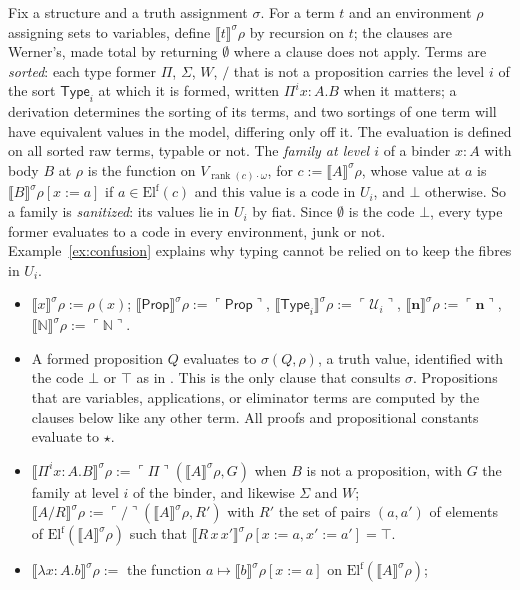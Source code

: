 \documentclass[10pt]{article}
\newcommand{\N}{\mathbb{N}}
\newcommand{\Prop}{\mathsf{Prop}}
\newcommand{\Type}{\mathsf{Type}}
\newcommand{\rk}{\operatorname{rank}}
\newcommand{\sem}[1]{\llbracket #1\rrbracket}
\newcommand{\El}{\mathrm{El}}
\newcommand{\code}[1]{\ulcorner #1\urcorner}
\newcommand{\U}{\mathcal{U}}
\begin{document}
\begin{definition}\label{def:fulleval}
Fix a structure and a truth assignment $\sigma$. For a term $t$ and an
environment $\rho$ assigning sets to variables, define $\sem t^\sigma\rho$
by recursion on $t$; the clauses are Werner's, made total by returning
$\emptyset$ where a clause does not apply. Terms are \emph{sorted}: each
type former $\Pi$, $\Sigma$, $W$, $/$ that is not a proposition carries
the level $i$ of the sort $\Type_i$ at which it is formed, written
$\Pi^ix{:}A.B$ when it matters; a derivation determines the sorting of
its terms, and two sortings of one term will have equivalent values in
the model, differing only off it. The evaluation is defined on all
sorted raw terms, typable or not. The \emph{family at level $i$} of a
binder $x{:}A$ with body $B$ at $\rho$ is the function on
$V_{\rk(c)\cdot\omega}$, for $c:=\sem A^\sigma\rho$, whose value at $a$ is
$\sem B^\sigma\rho[x{:=}a]$ if $a\in\El^{\mathrm f}(c)$ and this value is a
code in $U_i$, and $\bot$ otherwise. So a family is \emph{sanitized}: its
values lie in $U_i$ by fiat. Since $\emptyset$ is the code $\bot$, every
type former evaluates to a code in every environment, junk or not.
Example~\ref{ex:confusion} explains why typing cannot be relied on to
keep the fibres in $U_i$.
\begin{itemize}
\item $\sem x^\sigma\rho:=\rho(x)$; $\sem{\Prop}^\sigma\rho:=\code\Prop$,
  $\sem{\Type_i}^\sigma\rho:=\code{\U_i}$,
  $\sem{\mathbf n}^\sigma\rho:=\code{\mathbf n}$, $\sem\N^\sigma\rho:=\code\N$.
\item A formed proposition $Q$ evaluates to $\sigma(Q,\rho)$, a truth
  value, identified with the code $\bot$ or $\top$ as in
  \cite[Def.~4.1]{paper1}. This is the only clause that consults
  $\sigma$. Propositions that are variables, applications, or
  eliminator terms are computed by the clauses below like any other
  term. All proofs and propositional constants evaluate to $\star$.
\item $\sem{\Pi^ix{:}A.B}^\sigma\rho:=\code\Pi(\sem A^\sigma\rho,G)$ when $B$
  is not a proposition, with $G$ the family at level $i$ of the binder, and likewise
  $\Sigma$ and $W$; $\sem{A/R}^\sigma\rho:=\code/(\sem A^\sigma\rho,R')$
  with $R'$ the set of pairs $(a,a')$ of elements of
  $\El^{\mathrm f}(\sem A^\sigma\rho)$ such that
  $\sem{R\,x\,x'}^\sigma\rho[x{:=}a,x'{:=}a']=\top$.
\item $\sem{\lambda x{:}A.b}^\sigma\rho:=$ the function
  $a\mapsto\sem b^\sigma\rho[x{:=}a]$ on $\El^{\mathrm f}(\sem A^\sigma\rho)$;

\end{itemize}
\end{definition}
\end{document}
